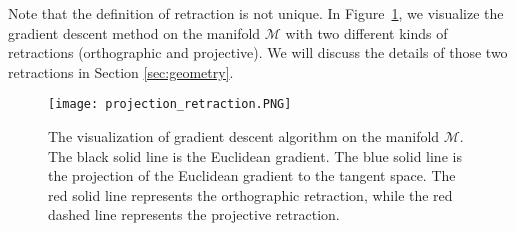 \documentclass[12pt]{article}
\newcommand{\grad}{\nabla}
\def\calM{\mathcal{M}}
\theoremstyle{plain}
\theoremstyle{definition}
\theoremstyle{plain}
\theoremstyle{plain}
\theoremstyle{remark}
\begin{document}
Note that the definition of retraction is not unique. In Figure~\ref{fig:visualization}, we visualize the gradient descent method on the manifold $\calM$ with two different kinds of retractions (orthographic and projective). We will discuss the details of those two retractions in Section \ref{sec:geometry}.

\begin{figure}
\begin{center}
\texttt{[image: projection\_retraction.PNG]}
\end{center}
\caption{The visualization of gradient descent algorithm on the manifold $\mathcal{M}$. The black solid line is the Euclidean gradient. The blue solid line is the projection of the Euclidean gradient to the tangent space. The red solid line represents the orthographic retraction, while the red dashed line represents the projective retraction.}\label{fig:visualization}
\end{figure}







\end{document}
